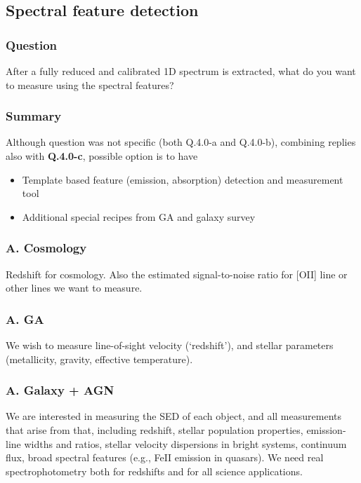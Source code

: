 \documentclass[a4paper,notitlepage]{article}
\begin{document}
\subsection{Spectral feature detection}

\subsubsection{Question}
After a fully reduced and calibrated 1D spectrum is extracted,
      what do you want to measure using the spectral features?

\subsubsection{Summary}

Although question was not specific (both Q.4.0-a and Q.4.0-b), combining replies 
also with {\bf Q.4.0-c}, possible option is to have 
\begin{itemize}
  \item Template based feature (emission, absorption) detection and measurement tool
  \item Additional special recipes from GA and galaxy survey
\end{itemize}

\subsubsection{A. Cosmology}
Redshift for cosmology. Also the estimated signal-to-noise ratio for [OII] line or other lines we want to measure. 

\subsubsection{A. GA}
We wish to measure line-of-sight velocity (`redshift'), and stellar
parameters (metallicity, gravity, effective temperature).

\subsubsection{A. Galaxy + AGN}
We are interested in measuring the SED of each object, and all measurements 
that arise from that, including redshift, stellar population properties, 
emission-line widths and ratios, stellar velocity dispersions in bright 
systems, continuum flux, broad spectral features (e.g., FeII emission in quasars). 
We need real spectrophotometry both for redshifts and for all science 
applications.
\end{document}
